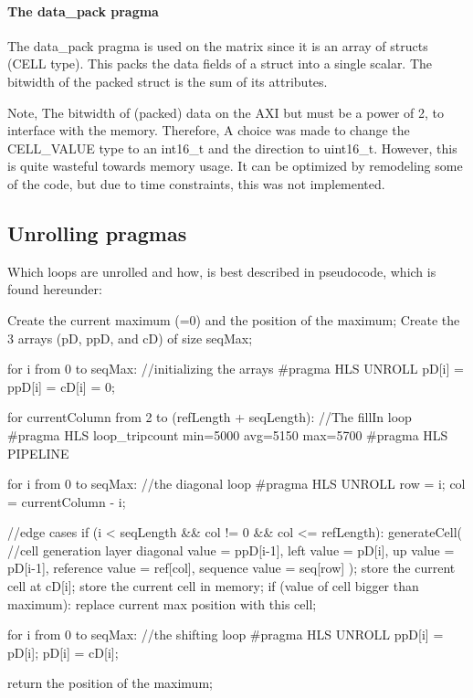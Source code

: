 \paragraph{The data\_pack pragma} The data\_pack pragma is used on the matrix since it is an array of structs (CELL type). This packs the data fields of a struct into a single scalar. The bitwidth of the packed struct is the sum of its attributes.

Note, The bitwidth of (packed) data on the AXI but must be a power of 2, to interface with the memory. Therefore, A choice was made to change the CELL\_VALUE type to an int16\_t and the direction to uint16\_t. However, this is quite wasteful towards memory usage. It can be optimized by remodeling some of the code, but due to time constraints, this was not implemented.

\subsection{Unrolling pragmas}
Which loops are unrolled and how, is best described in pseudocode, which is found hereunder:

\begin{lcverbatim}
Create the current maximum (=0) and the position of the maximum;
Create the 3 arrays (pD, ppD, and cD) of size seqMax;

for i from 0 to seqMax: //initializing the arrays
   #pragma HLS UNROLL
   pD[i] = ppD[i] = cD[i] = 0;

for currentColumn from 2 to (refLength + seqLength): //The fillIn loop
   #pragma HLS loop_tripcount min=5000 avg=5150 max=5700
   #pragma HLS PIPELINE
	
   for i from 0 to seqMax: //the diagonal loop
      #pragma HLS UNROLL
      row = i;
      col = currentColumn - i;
      
      //edge cases
      if (i < seqLength && col != 0 && col <= refLength):
         generateCell(  //cell generation layer
         	diagonal value = ppD[i-1], 
         	left value = pD[i], 
         	up value = pD[i-1],
         	reference value = ref[col],
         	sequence value = seq[row]
         );
         store the current cell at cD[i];
         store the current cell in memory;
         if (value of cell bigger than maximum):
            replace current max position with this cell;
	
	
   for i from 0 to seqMax: //the shifting loop
      #pragma HLS UNROLL
      ppD[i] = pD[i];
      pD[i] = cD[i];

return the position of the maximum;
\end{lcverbatim}

